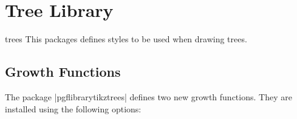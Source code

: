 %




\section{Tree Library}

\label{section-tree-library}


\begin{tikzlibrary}{trees}
  This packages defines styles to be used when drawing trees. 
\end{tikzlibrary}

\subsection{Growth Functions}

The package |pgflibrarytikztrees| defines two new growth
functions. They are installed using the following options:

